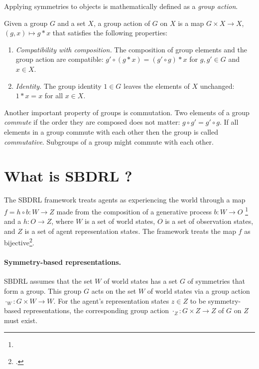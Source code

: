 Applying symmetries to objects is mathematically defined as a \textit{group action}.

\begin{definition}
	Given a group $G$ and a set $X$, a group action of $G$ on $X$ is a map $G \times X \to X$, $(g,x) \mapsto g * x$ that satisfies the following properties:
	\begin{enumerate}
		\item \textit{Compatibility with composition.}
		      The composition of group elements and the group action are compatible: $g' \circ (g * x) = (g' \circ g) * x$ for $g,g' \in G$ and $x \in X$.
		\item \textit{Identity.}
		      The group identity $1 \in G$ leaves the elements of $X$ unchanged: $1 * x = x$ for all $x \in X$.
	\end{enumerate}
\end{definition}

Another important property of groups is commutation.
Two elements of a group \textit{commute} if the order they are composed does not matter: $g \circ g' = g' \circ g$.
If all elements in a group commute with each other then the group is called \textit{commutative}.
Subgroups of a group might commute with each other.


\section{What is SBDRL ?}

The SBDRL framework treats agents as experiencing the world through a map $f = h \circ b: W \to Z$ made from the composition of a generative process $b: W \to O$ 
\footnote{
} and a $h: O \to Z$, where $W$ is a set of world states, $O$ is a set of observation states, and $Z$ is a set of agent representation states.
The framework treats the map $f$ as bijective\footnote{.}.

\paragraph{Symmetry-based representations.}
SBDRL assumes that the set $W$ of world states has a set $G$ of symmetries that form a group.
This group $G$ acts on the set $W$ of world states via a group action $\cdot_{W}: G \times W \to W$.
For the agent's representation states $z \in Z$ to be symmetry-based representations, the corresponding group action $\cdot_{Z}: G \times Z \to Z$ of $G$ on $Z$ must exist.

